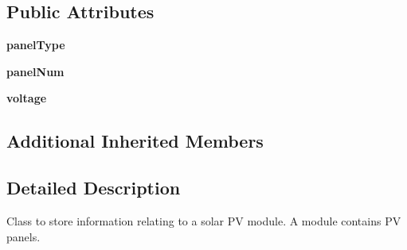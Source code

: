 \subsection*{Public Attributes}
\begin{DoxyCompactItemize}
\item 
\hypertarget{class_solar_calculator_1_1_assets_1_1_p_v_module_ad15a2f1db79d5a13efb485caf6e8b5d8}{{\bfseries panel\-Type}}\label{class_solar_calculator_1_1_assets_1_1_p_v_module_ad15a2f1db79d5a13efb485caf6e8b5d8}

\item 
\hypertarget{class_solar_calculator_1_1_assets_1_1_p_v_module_a696cb6e833f9be72ec2f3e72a6a8993e}{{\bfseries panel\-Num}}\label{class_solar_calculator_1_1_assets_1_1_p_v_module_a696cb6e833f9be72ec2f3e72a6a8993e}

\item 
\hypertarget{class_solar_calculator_1_1_assets_1_1_p_v_module_aef31374c40cc57ed432c8cb5fa16ebe3}{{\bfseries voltage}}\label{class_solar_calculator_1_1_assets_1_1_p_v_module_aef31374c40cc57ed432c8cb5fa16ebe3}

\end{DoxyCompactItemize}
\subsection*{Additional Inherited Members}


\subsection{Detailed Description}
\begin{DoxyVerb}Class to store information relating to a solar PV module. A module contains PV panels. \end{DoxyVerb}
 

